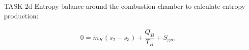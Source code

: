 TASK 2d  
Entropy balance around the combustion chamber to calculate entropy production:  

\[
0 = \dot{m}_K (s_2 - s_3) + \frac{\dot{Q}_B}{T_B} + \dot{S}_{\text{gen}}
\]